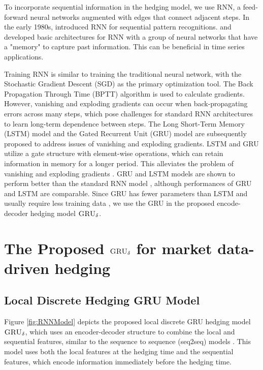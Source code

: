 \documentclass[letterpaper,12pt,titlepage,oneside,final]{book}
\numberwithin{equation}{section}
\theoremstyle{definition}
\newcommand{\model}{\textsc{GRU}_\delta}
\newcommand{\vh}{\mathbf{h}}
\begin{document}
To incorporate sequential information in the hedging model, we use
RNN,  a feed-forward neural networks augmented with edges that connect adjacent  steps.
In the early 1980s, \citet{hopfield1982neural} introduced RNN  for sequential pattern recognitions.
\citet{jordan1986serial} and \citet{elman1990finding} developed  basic architectures for RNN with a group of neural networks that have a "memory" to capture past information. This can be beneficial in time series applications.

Training RNN is similar to training the traditional neural network, with
the Stochastic Gradient Descent (SGD) as the primary optimization tool.
The Back Propagation Through Time (BPTT) algorithm is used to calculate gradients.
However, vanishing and exploding gradients  \citep{hochreiter2001gradient} can occur when back-propagating errors across many  steps,
which pose challenges for standard RNN architectures to learn long-term dependence between  steps.
The Long Short-Term Memory (LSTM) \citep{hochreiter1997long} model and the Gated Recurrent Unit (GRU) model \citep{cho2014learning} are
subsequently proposed to address issues of vanishing and exploding gradients.
LSTM  and GRU utilize a gate structure with element-wise operations, which  %
can retain information in memory for a longer  period.  This alleviates the problem of vanishing and exploding gradients \citep{hochreiter1997long}. %
GRU and  LSTM models are shown to perform better than the standard RNN model \citep{cho2014learning}, although
performances of GRU and  LSTM are comparable.
Since GRU  has fewer parameters than LSTM  and usually require less training data \citep{yin2017comparative},
we use the GRU in the proposed encode-decoder hedging model $\model$.


\section{ The Proposed  $\model$ for market data-driven hedging}
\label{sec:model}
\subsection{Local Discrete Hedging GRU Model}
Figure \ref{fig:RNNModel} depicts the proposed local discrete GRU  hedging  model $\model$,
 which uses an encoder-decoder structure to combine the local and sequential features,  similar to the sequence to sequence (seq2seq) models \citep{cho2014learning}.  This model uses both the  local features at the hedging time and the sequential features, which encode information immediately before the hedging time.
\end{document}
